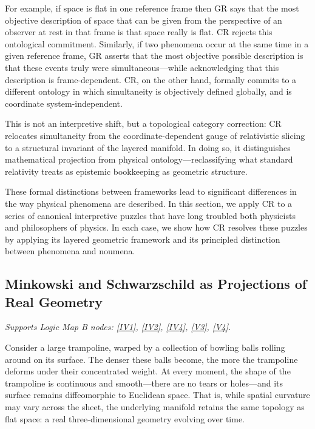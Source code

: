 \documentclass[12pt]{book}
\begin{document}
For example, if space is flat in one reference frame then GR says that the most objective description of space that can be given from the perspective of an observer at rest in that frame is that space really is flat. CR rejects this ontological commitment. Similarly, if two phenomena occur at the same time in a given reference frame, GR asserts that the most objective possible description is that these events truly were simultaneous---while acknowledging that this description is frame-dependent. CR, on the other hand, formally commits to a different ontology in which simultaneity is objectively defined globally, and is coordinate system-independent.

This is not an interpretive shift, but a topological category correction: CR relocates simultaneity from the coordinate-dependent gauge of relativistic slicing to a structural invariant of the layered manifold. In doing so, it distinguishes mathematical projection from physical ontology---reclassifying what standard relativity treats as epistemic bookkeeping as geometric structure.

These formal distinctions between frameworks lead to significant differences in the way physical phenomena are described. In this section, we apply CR to a series of canonical interpretive puzzles that have long troubled both physicists and philosophers of physics. In each case, we show how CR resolves these puzzles by applying its layered geometric framework and its principled distinction between phenomena and noumena. 

\subsection{Minkowski and Schwarzschild as Projections of Real Geometry}\label{sec:5.4.1}
\noindent\textit{Supports Logic Map B nodes: \hyperref[appendix:IV1]{[IV1]}, \hyperref[appendix:IV2]{[IV2]}, \hyperref[appendix:IV4]{[IV4]}, \hyperref[appendix:V3]{[V3]}, \hyperref[appendix:V4]{[V4]}.}

\vspace{4pt}

Consider a large trampoline, warped by a collection of bowling balls rolling around on its surface. The denser these balls become, the more the trampoline deforms under their concentrated weight. At every moment, the shape of the trampoline is continuous and smooth---there are no tears or holes---and its surface remains diffeomorphic to Euclidean space. That is, while spatial curvature may vary across the sheet, the underlying manifold retains the same topology as flat space: a real three-dimensional geometry evolving over time.
\end{document}
